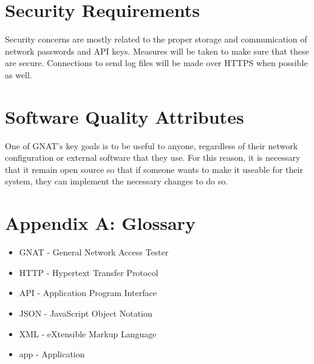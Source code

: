 \documentclass{scrreprt}
\begin{document}
\section{Security Requirements}

Security concerns are mostly related to the proper storage and communication of network passwords and API keys.  Measures will be taken to make sure that these are secure.  Connections to send log files will be made over HTTPS when possible as well.

\section{Software Quality Attributes}
One of GNAT's key goals is to be useful to anyone, regardless of their network configuration or external software that they use.  For this reason, it is necessary that it remain open source so that if someone wants to make it useable for their system, they can implement the necessary changes to do so.

\section{Appendix A: Glossary}
\begin{itemize}
  \item GNAT - General Network Access Tester
  \item HTTP - Hypertext Transfer Protocol
  \item API - Application Program Interface
  \item JSON - JavaScript Object Notation
  \item XML - eXtensible Markup Language
  \item app - Application

\end{itemize}
\end{document}
